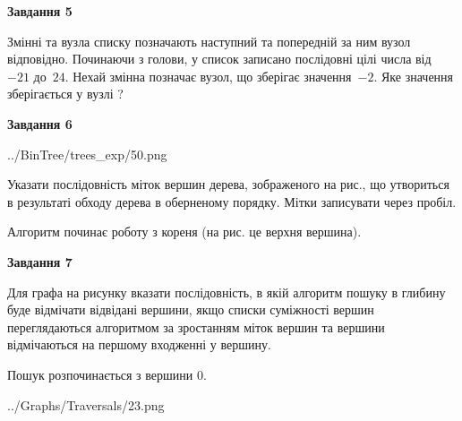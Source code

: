 \documentclass[12pt, ukrainian]{article}
\begin{document}
{\begin {large}
{\begin {center}\textbf{Завдання 5}\end {center}}\par
Змінні  та  вузла списку позначають наступний та попередній за ним вузол відповідно. Починаючи з голови, у список записано послідовні цілі числа від~$-21$ до~$24$. Нехай змінна  позначає вузол, що зберігає значення~$-2$.
Яке значення зберігається у вузлі  ?\par
\newpage

{\begin {center}\textbf{Завдання 6}\end {center}}\par

\begin{center}
	{../BinTree/trees_exp/50.png}
\end{center}
Указати послідовність міток вершин дерева, зображеного на рис., що утвориться в результаті обходу дерева в оберненому порядку. Мітки записувати через пробіл.\par Алгоритм починає роботу з кореня (на рис. це верхня вершина).\par
\newpage

{\begin {center}\textbf{Завдання 7}\end {center}}\par
Для графа на рисунку вказати послідовність, в якій алгоритм пошуку в глибину буде відмічати відвідані вершини, якщо списки суміжності вершин переглядаються алгоритмом за зростанням міток вершин та вершини відмічаються на першому вход\-женні у вершину.\par
Пошук розпочинається з вершини 0.\par

\begin{center}
	{../Graphs/Traversals/23.png}
\end{center}\par
\newpage


\end{large}}
\end{document}
